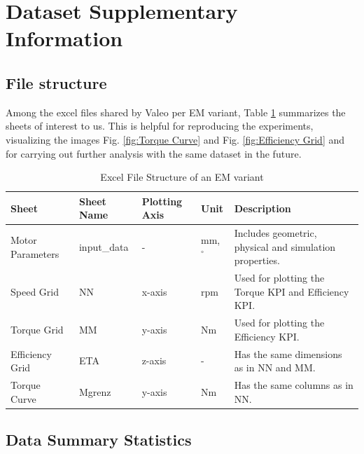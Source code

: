 \documentclass{report} %
\begin{document}
\section{Dataset Supplementary Information}
\label{sec:Dataset Supplementary Information}
\subsection{File structure}
\label{subsec:File structure}
Among the excel files shared by Valeo per \ac{EM} variant, Table \ref{tab:Excel File Structure} summarizes the sheets of interest to us.
This is helpful for reproducing the experiments, visualizing the images Fig. \ref{fig:Torque Curve} and Fig. \ref{fig:Efficiency Grid} and for carrying out further 
analysis with the same dataset in the future.

\begin{table}[H]
    \centering
    \begin{tabular}{|p{1.7cm}|p{1.5cm}|p{1.3cm}|p{.7cm}|p{8.3cm}|}
    \hline
    {\bf Sheet} & {\bf Sheet Name} & {\bf Plotting Axis} & {\bf Unit} &  {\bf Description}\\
    \hline
    Motor Parameters & input\_data & - & mm, $^\circ$ & Includes geometric, physical and simulation properties.\\
    Speed Grid & NN & x-axis & rpm & Used for plotting the Torque \ac{KPI} and Efficiency \ac{KPI}.\\
    Torque Grid & MM & y-axis & Nm & Used for plotting the Efficiency \ac{KPI}.\\
    Efficiency Grid & ETA & z-axis & - & Has the same dimensions as in NN and MM. \\
    Torque Curve & Mgrenz & y-axis & Nm & Has the same columns as in NN. \\
    \hline
    \end{tabular}
    \caption{Excel File Structure of an \ac{EM} variant}
    \label{tab:Excel File Structure}
\end{table}

\subsection{Data Summary Statistics}
\label{subsec:Data Summary Statistics}
\end{document}
